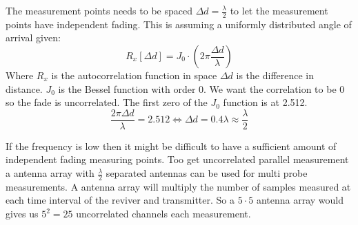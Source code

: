
The measurement points needs to be spaced $\Delta d = \frac{\lambda}{2}$ to let the measurement points have independent fading. This is assuming a uniformly distributed angle of arrival given:
\begin{equation}
R_x[\Delta d] = J_0\cdot(2\pi \frac{\Delta d}{\lambda})
\end{equation}
Where $R_x$ is the autocorrelation function in space $\Delta d$ is the difference in distance. $J_0$ is the Bessel function with order 0.
We want the correlation to be 0 so the fade is uncorrelated. The first zero of the $J_0$ function is at 2.512.
\begin{equation}
\frac{2\pi \Delta d}{\lambda} = 2.512 \Leftrightarrow \Delta d = 0.4 \lambda \approx \frac{\lambda}{2}
\end{equation}

If the frequency is low then it might be difficult to have a sufficient amount of independent fading measuring points. \citep[p.11]{UWMeasurement} Too get uncorrelated  parallel measurement a antenna array with $\frac{\lambda}{2}$ separated antennas can be used for multi probe measurements. A antenna array will multiply the number of samples measured at each time interval of the reviver and transmitter. So a $5\cdot 5$ antenna array would gives us $5^2 = 25$ uncorrelated channels each measurement.




